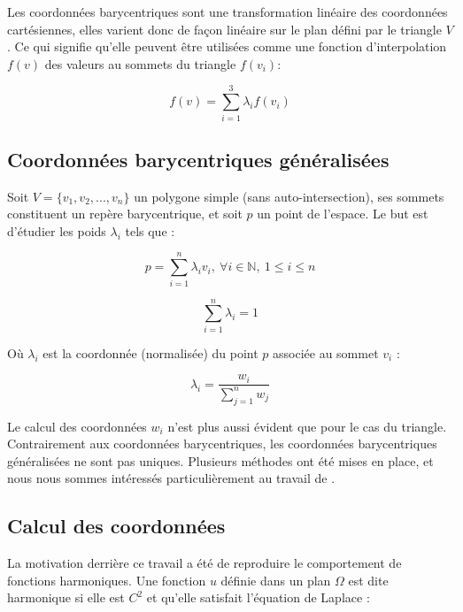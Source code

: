 Les coordonnées barycentriques sont une transformation linéaire des
coordonnées cartésiennes, elles varient donc de façon linéaire sur le plan
défini par le triangle $V$. Ce qui signifie qu'elle peuvent être utilisées
comme une fonction d'interpolation $f(v)$ des valeurs au sommets du triangle
$f(v_i)$:

\begin{equation}
  f(v) = \sum_{i=1}^{3} \lambda_i f(v_i)
\end{equation}

\subsection{Coordonnées barycentriques généralisées}

Soit $V = \{v_1, v_2, ..., v_n\}$ un polygone simple (sans auto-intersection),
ses sommets constituent un repère barycentrique, et soit $p$ un point de
l'espace. Le but est d'étudier les poids $\lambda_i$ tels que :

\begin{equation}
  p = \sum_{i=1}^{n} \lambda_i v_i ,
  ~ \forall i \in \mathbb{N} ,~ 1 \leq i \leq n
\end{equation}

\begin{equation}
  \sum_{i=1}^n \lambda_i = 1
\end{equation}

Où $\lambda_i$ est la coordonnée (normalisée) du point $p$ associée au sommet
$v_i$ :

\begin{equation}
  \lambda_i = \frac{w_i}{\sum_{j=1}^n w_j}
\end{equation}

Le calcul des coordonnées $w_i$ n'est plus aussi évident que pour le cas du
triangle. Contrairement aux coordonnées barycentriques, les coordonnées
barycentriques généralisées ne sont pas uniques. Plusieurs méthodes ont été
mises en place, et nous nous sommes intéressés particulièrement au travail de
\cite{Flo03}.

\subsection{Calcul des coordonnées}

La motivation derrière ce travail a été de reproduire le comportement de
fonctions harmoniques. Une fonction $u$ définie dans un plan $\Omega$ est dite
harmonique si elle est $C^2$ et qu'elle satisfait l'équation de Laplace :

